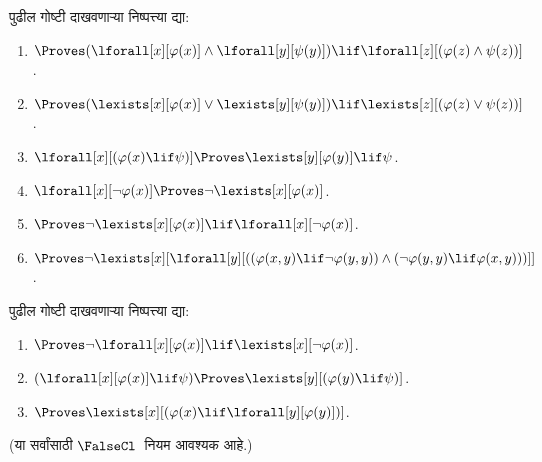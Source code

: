 \begin{prob}
पुढील गोष्टी दाखवणाऱ्या निष्पत्त्या द्या:
\begin{enumerate}
\item $\Proves (\lforall[x][\varphi(x)] \land \lforall[y][\psi(y)]) \lif
\lforall[z][(\varphi(z) \land \psi(z))]$.
\item $\Proves (\lexists[x][\varphi(x)] \lor \lexists[y][\psi(y)]) \lif
\lexists[z][(\varphi(z) \lor \psi(z))]$.
\item $\lforall[x][(\varphi(x) \lif \psi)] \Proves \lexists[y][\varphi(y)] \lif \psi$.
\item $\lforall[x][\lnot \varphi(x)] \Proves \lnot\lexists[x][\varphi(x)]$.
\item $\Proves \lnot\lexists[x][\varphi(x)] \lif \lforall[x][\lnot \varphi(x)]$.
\item $\Proves \lnot\lexists[x][\lforall[y][((\varphi(x,y) \lif \lnot
\varphi(y,y)) \land (\lnot \varphi(y,y) \lif \varphi(x,y)))]]$.
\end{enumerate}
\end{prob}
\begin{prob}
पुढील गोष्टी दाखवणाऱ्या निष्पत्त्या द्या:
\begin{enumerate}
\item $\Proves \lnot\lforall[x][\varphi(x)] \lif \lexists[x][\lnot\varphi(x)]$.
\item $(\lforall[x][\varphi(x)] \lif \psi) \Proves \lexists[y][(\varphi(y) \lif \psi)]$.
\item $\Proves \lexists[x][(\varphi(x) \lif \lforall[y][\varphi(y)])]$.
\end{enumerate}
(या सर्वांसाठी $\FalseCl$~नियम आवश्यक आहे.)
\end{prob}
